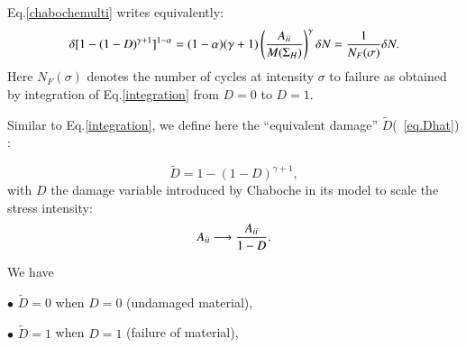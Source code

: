 \documentclass[3p,times,number,review]{elsarticle}
\newcommand{\figref}[1]{\figurename~\ref{#1}}
\begin{document}
Eq.\eqref{chabochemulti} writes equivalently:
\begin{equation}\delta [1-(1-D)^{\gamma+1}]^{1-\alpha}=(1-\alpha)(\gamma+1)\left(\dfrac{{A}_{\uppercase\expandafter{\romannumeral2}} }{M(\Sigma_H)}\right)^\gamma \delta N=\dfrac{1}{N_F(\sigma)}\delta N.
\label{integration}
\end{equation}
Here $N_F(\sigma)$ denotes the number of cycles at intensity $\sigma$ to failure as obtained by integration of Eq.\eqref{integration} from $D=0$ to $D=1$. 

%
%

Similar to Eq.\eqref{integration}, we define here the ``equivalent damage'' $\tilde{D}$(\figref{eq.Dhat}) :

\begin{equation}
\tilde{D}=1-(1-D)^{\gamma+1},
\label{eq.Dhat}
\end{equation}
with $D$ the damage variable introduced by Chaboche in its model to scale the stress intensity:
$${A}_{\uppercase\expandafter{\romannumeral2}} \longrightarrow \dfrac{{A}_{\uppercase\expandafter{\romannumeral2}}}{1-D}.$$

We have 

$\bullet$ $\tilde{D}=0$ when $D=0$ (undamaged material),

$\bullet$ $\tilde{D}=1$ when $D=1$ (failure of material),	
\end{document}
